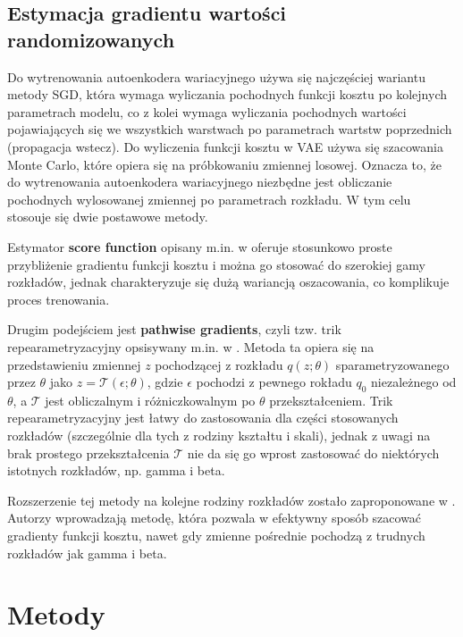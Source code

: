 \documentclass{iithesis}
\begin{document}
\section{Estymacja gradientu wartości randomizowanych}
Do wytrenowania autoenkodera wariacyjnego używa się najczęściej wariantu metody SGD, która
wymaga wyliczania pochodnych funkcji kosztu po kolejnych parametrach modelu, co z kolei
wymaga wyliczania pochodnych wartości pojawiających się we wszystkich warstwach po parametrach
wartstw poprzednich (propagacja wstecz).
Do wyliczenia funkcji kosztu w VAE używa się szacowania Monte Carlo, które opiera się na
próbkowaniu zmiennej losowej. Oznacza to, że do wytrenowania autoenkodera wariacyjnego
niezbędne jest obliczanie pochodnych wylosowanej zmiennej po parametrach rozkładu.
W tym celu stosouje się dwie postawowe metody.

Estymator \textbf{score function} opisany m.in. w \cite{score_fn} oferuje stosunkowo
proste przybliżenie gradientu funkcji kosztu i można go stosować do szerokiej gamy rozkładów,
jednak charakteryzuje się dużą wariancją oszacowania, co komplikuje proces trenowania.

Drugim podejściem jest \textbf{pathwise gradients}, czyli tzw. trik repearametryzacyjny
opsisywany m.in. w \cite{vae}. Metoda ta opiera się na przedstawieniu zmiennej $z$ pochodzącej
z rozkładu $q(z;\theta)$ sparametryzowanego przez $\theta$ jako $z=\mathcal{T}(\epsilon;\theta)$,
gdzie $\epsilon$ pochodzi z pewnego rokładu $q_0$ niezależnego od $\theta$, a
$\mathcal{T}$ jest obliczalnym i różniczkowalnym po $\theta$ przekształceniem.
Trik repearametryzacyjny jest łatwy do zastosowania dla części stosowanych rozkładów
(szczególnie dla tych z rodziny kształtu i skali), jednak z uwagi na brak prostego przekształcenia
$\mathcal{T}$ nie da się go wprost zastosować do niektórych istotnych rozkładów, np. gamma i beta.

Rozszerzenie tej metody na kolejne rodziny rozkładów zostało zaproponowane w \cite{pathwise_gradients}.
Autorzy wprowadzają metodę, która pozwala w efektywny sposób szacować gradienty funkcji kosztu,
nawet gdy zmienne pośrednie pochodzą z trudnych rozkładów jak gamma i beta.


\chapter{Metody}
\end{document}
